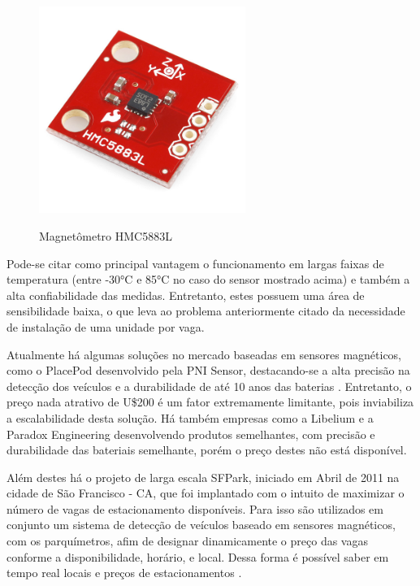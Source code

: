 \documentclass[oneside,openright,12pt]{ufsm_2015} %
\begin{document}
\begin{figure}[ht]
    \caption{\label{exepretex} Magnetômetro HMC5883L}
    \centering
    \includegraphics[width=0.6\textwidth]{figuras/5883L_BoB.jpg}
    \vspace{\baselineskip} %
        \label{fig:magnetometro}
\end{figure}

Pode-se citar como principal vantagem o funcionamento em largas faixas de temperatura (entre -30°C e 85°C no caso do sensor mostrado acima) e também a alta confiabilidade das medidas. Entretanto, estes possuem uma área de sensibilidade baixa, o que leva ao problema anteriormente citado da necessidade de instalação de uma unidade por vaga.

Atualmente há algumas soluções no mercado baseadas em sensores magnéticos, como o PlacePod desenvolvido pela PNI Sensor, destacando-se a alta precisão na detecção dos veículos e a durabilidade de até 10 anos das baterias \cite{placepod}. Entretanto, o preço nada atrativo de U\$200 é um fator extremamente limitante, pois inviabiliza a escalabilidade desta solução. Há também empresas como a Libelium e a Paradox Engineering desenvolvendo produtos semelhantes, com precisão e durabilidade das bateriais semelhante, porém o preço destes não está disponível.

Além destes há o projeto de larga escala SFPark, iniciado em Abril de 2011 na cidade de São Francisco - CA, que foi implantado com o intuito de maximizar o número de vagas de estacionamento disponíveis. Para isso são utilizados em conjunto um sistema de detecção de veículos baseado em sensores magnéticos, com os parquímetros, afim de designar dinamicamente o preço das vagas conforme a disponibilidade, horário, e local. Dessa forma é possível saber em tempo real locais e preços de estacionamentos \cite{site:mobilize}.
\end{document}
